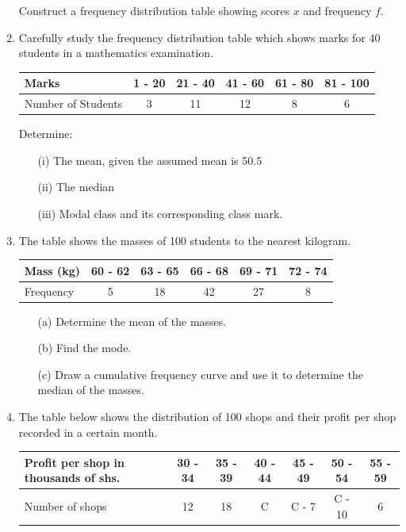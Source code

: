 \begin{enumerate}
	Construct a frequency distribution table showing scores $x$ and frequency $f$.
	
	\item Carefully study the frequency distribution table which shows marks for 40 students in a mathematics examination.\\
	
	\begin{tabular}{|l|c|c|c|c|c|} \hline
	Marks & 1 - 20&21 - 40&41 - 60&61 - 80&81 - 100\\ \hline
	Number of Students&3&11&12&8&6\\ \hline	
	\end{tabular}
	Determine:
	\begin{itemize}
	\item[(i)] The mean, given the assumed mean is 50.5
	\item[(ii)] The median
	\item[(iii)] Modal class and its corresponding class mark.
	\end{itemize} 
	
	\item The table shows the masses of 100 students to the nearest kilogram.\\
	
	\begin{tabular}{|l|c|c|c|c|c|} \hline
	Mass (kg) &60 - 62&63 - 65&66 - 68&69 - 71&72 - 74 \\ \hline
	Frequency&5&18&42&27&8 \\ \hline	
	\end{tabular}
	
	\begin{itemize}
	\item[(a)] Determine the mean of the masses.
	\item[(b)] Find the mode.
	\item[(c)] Draw a cumulative frequency curve and use it to determine the median of the masses.
	\end{itemize}
	
	\item The table below shows the distribution of 100 shops and their profit per shop recorded in a certain month.\\
	
	\begin{tabular}{|l|c|c|c|c|c|c|} \hline
	Profit per shop in thousands of shs.&30 - 34&35 - 39&40 - 44&45 - 49&50 - 54&55 - 59 \\ \hline
	Number of shops&12&18&C&C - 7&C - 10&6 \\ \hline	
	\end{tabular}
	

\end{enumerate}
